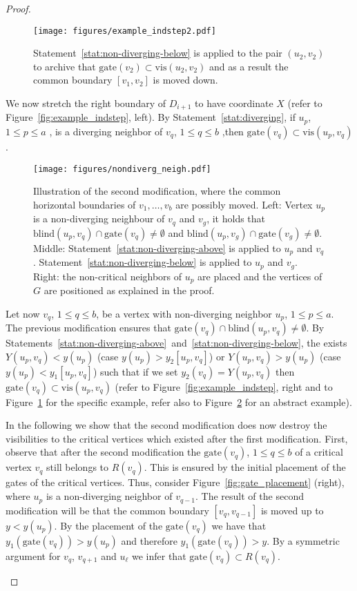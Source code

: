 \documentclass{llncs}
\newcommand{\gate}{\textrm{gate}}
\newcommand{\vis}{\textrm{vis}}
\newcommand{\blind}{\textrm{blind}}
\begin{document}
\begin{proof}
\begin{description}
\begin{figure}[htb]
\centering
\texttt{[image: figures/example\_indstep2.pdf]}
\caption{\small  Statement~\ref{stat:non-diverging-below} is applied to the pair $(u_2,v_2)$ to archive that $\gate(v_2) \subset \vis(u_2,v_2)$ and as a result the common boundary $[v_1,v_2]$ is moved down.}
\label{fig:example_indstep2} 
\end{figure}

We now stretch the right boundary of $D_{i+1}$ to have coordinate $X$ (refer to Figure~\ref{fig:example_indstep}, left). By Statement~\ref{stat:diverging}, if $u_p$, $1 \leq p \leq a$ , is a diverging neighbor of $v_q$, $1 \leq q \leq b$ ,then  $\gate(v_q) \subset \vis(u_p,v_q)$. 


\begin{figure}[htb]
\centering
\texttt{[image: figures/nondiverg\_neigh.pdf]}
\caption{\small  Illustration of the second  modification, where the common horizontal boundaries of $v_1,\dots,v_b$ are possibly moved. Left:  Vertex  $u_p$ is a non-diverging neighbour of $v_q$ and $v_g$,  it holds that $\blind(u_p,v_q) \cap \gate(v_q) \neq \emptyset$ and $\blind(u_p,v_g) \cap \gate(v_g) \neq \emptyset$.  Middle: Statement~\ref{stat:non-diverging-above} is applied to $u_p$ and $v_q$. Statement~\ref{stat:non-diverging-below} is applied to $u_p$ and $v_g$. Right: the non-critical neighbors of $u_p$ are placed and the vertices of $G$ are positioned as explained in the proof. }
\label{fig:nondiverg_neigh} 
\end{figure}

Let now $v_q$, $1\leq q \leq b$, be a vertex with non-diverging neighbor $u_p$, $1\leq p \leq a$. The previous modification ensures that $\gate(v_q) \cap \blind(u_p,v_q) \neq \emptyset$.   By Statements~\ref{stat:non-diverging-above}~and~\ref{stat:non-diverging-below},  the exists $Y(u_p,v_q)<y(u_p)$ (case $y(u_p)>y_2[u_p,v_q]$) or $Y(u_p,v_q) > y(u_p)$ (case $y(u_p) < y_1[u_p,v_q]$) such that if we set $y_2(v_q)=Y(u_p,v_q)$ then $\gate(v_q) \subset \vis(u_p,v_q)$ (refer to Figure~\ref{fig:example_indstep}, right and to Figure~\ref{fig:example_indstep2} for the specific example, refer also to Figure~\ref{fig:nondiverg_neigh} for an abstract example). 

In the following we show that the second modification does now destroy the visibilities to the critical vertices which existed after the first modification.  First, observe that after the second modification the  $\gate(v_q)$, $1\leq q \leq b$ of a critical vertex $v_q$  still belongs to $R(v_q)$.  This is ensured by the initial placement of the gates of the critical vertices. Thus, consider Figure~\ref{fig:gate_placement} (right), where $u_p$ is a non-diverging neighbor of $v_{q-1}$. The result of the second modification will be that the common boundary $[v_q,v_{q-1}]$ is moved up to  $y<y(u_p)$. By the placement of the $\gate(v_q)$ we have that $y_1(\gate(v_q)) > y(u_p)$ and therefore $y_1(\gate(v_q))>y$. By a symmetric argument for $v_q$, $v_{q+1}$ and $u_\ell$ we infer that  $\gate(v_q) \subset R(v_q)$. 


\end{description}
\end{proof}
\end{document}
